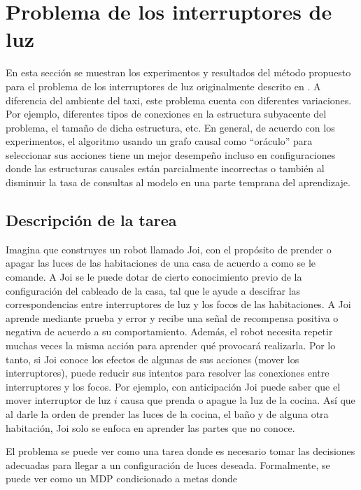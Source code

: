 \section{Problema de los interruptores de luz}

En esta sección se muestran los experimentos y resultados del método propuesto para
el problema de los interruptores de luz originalmente descrito en \cite{nair2019causal}.
A diferencia del ambiente del taxi, este problema cuenta 
con diferentes variaciones. Por ejemplo,
diferentes tipos de conexiones en la estructura subyacente del problema, el tamaño de dicha estructura, etc.
En general, de acuerdo con los experimentos, el algoritmo usando un grafo causal como ``oráculo'' para seleccionar sus acciones tiene un mejor desempeño incluso en 
configuraciones donde las estructuras causales están parcialmente incorrectas o también 
al disminuir la tasa de consultas al modelo en una parte temprana del aprendizaje.

\subsection{Descripción de la tarea}\label{section:switches-example}

Imagina que construyes un robot llamado Joi, con el propósito de prender o apagar las luces de las habitaciones 
de una casa de acuerdo a como se le comande.
A Joi se le puede dotar de cierto conocimiento previo de la configuración
del cableado de la casa, tal que le ayude a descifrar las correspondencias entre
interruptores de luz y los focos de las habitaciones. 
 A Joi aprende mediante prueba
 y error y recibe una señal de recompensa positiva o negativa de acuerdo a su comportamiento. Además, el robot 
 necesita repetir muchas veces la misma acción para aprender
 qué provocará realizarla. Por lo tanto, si Joi conoce los efectos de algunas de sus acciones (mover los interruptores), puede reducir sus intentos para
 resolver las conexiones entre interruptores y los focos. 
 Por ejemplo, con anticipación Joi puede saber que el mover interruptor de luz $i$ causa que
prenda o apague la luz de la cocina.
 Así que al darle la orden de prender las luces de la cocina, el baño y de alguna otra habitación, Joi solo se enfoca en aprender las partes que no
 conoce.
 
 El problema se puede ver como una tarea donde es necesario tomar las
 decisiones adecuadas para llegar a un configuración de luces deseada. Formalmente, se puede ver como un MDP condicionado a metas donde 
 
